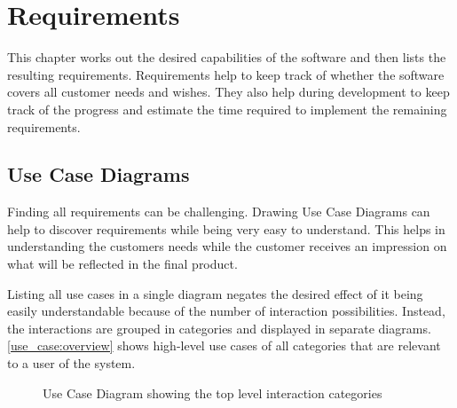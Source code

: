 \chapter{Requirements}

This chapter works out the desired capabilities of the software and then lists the resulting requirements.
Requirements help to keep track of whether the software covers all customer needs and wishes.
They also help during development to keep track of the progress and estimate the time required to implement the remaining requirements.




\section{Use Case Diagrams}

Finding all requirements can be challenging.
Drawing Use Case Diagrams can help to discover requirements while being very easy to understand.
This helps in understanding the customers needs \cite{Rosenberg2007} while the customer receives an impression on what will be reflected in the final product.

Listing all use cases in a single diagram negates the desired effect of it being easily understandable because of the number of interaction possibilities.
Instead, the interactions are grouped in categories and displayed in separate diagrams.
\autoref{use_case:overview} shows high-level use cases of all categories that are relevant to a user of the system.

\begin{figure}[H]
	\centering
	\caption{Use Case Diagram showing the top level interaction categories}
	\label{use_case:overview}
\end{figure}

